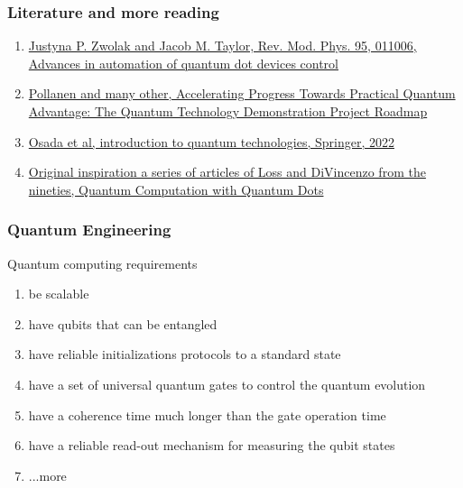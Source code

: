 \documentclass{beamer}
\begin{document}
\begin{frame}
\frametitle{Literature and more reading}

\begin{enumerate}
\item \href{{https://journals.aps.org/rmp/abstract/10.1103/RevModPhys.95.011006}}{Justyna P. Zwolak and Jacob M. Taylor, Rev. Mod. Phys. 95, 011006, Advances in automation of quantum dot devices control}

\item \href{{https://arxiv.org/pdf/2210.14757.pdf}}{Pollanen and many other, Accelerating Progress Towards Practical Quantum Advantage: The Quantum Technology Demonstration Project Roadmap}

\item \href{{https://link.springer.com/book/10.1007/978-981-19-4641-7}}{Osada et al, introduction to quantum technologies, Springer, 2022}

\item \href{{https://journals.aps.org/pra/pdf/10.1103/PhysRevA.57.120}}{Original inspiration a series of articles of Loss and DiVincenzo from the nineties, Quantum Computation with Quantum Dots}
\end{enumerate}

\noindent
\end{frame}

\begin{frame}
\frametitle{Quantum Engineering}

\begin{block}{Quantum computing requirements }
\begin{enumerate}
\item be scalable

\item have qubits that can be entangled

\item have reliable initializations protocols to a standard state

\item have a set of universal quantum gates to control the quantum evolution

\item have a coherence time much longer than the gate operation time

\item have a reliable read-out mechanism for measuring the qubit states

\item ...more
\end{enumerate}

\noindent
\end{block}
\end{frame}
\end{document}

